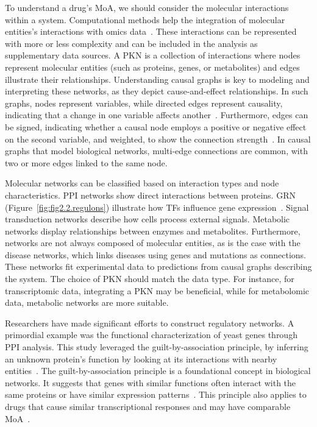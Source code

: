 To understand a drug's \gls{MoA}, we should consider the molecular interactions within a system.
Computational methods help the integration of molecular entities's interactions with omics data~\cite{RN38}.
These interactions can be represented with more or less complexity and can be included in the analysis as supplementary data sources. 
A \gls{PKN} is a collection of interactions where nodes represent molecular entities (such as proteins, genes, or metabolites) and edges illustrate their relationships. 
Understanding causal graphs is key to modeling and interpreting these networks, as they depict cause-and-effect relationships. 
In such graphs, nodes represent variables, while directed edges represent causality, indicating that a change in one variable affects another~\cite{RN37}. 
Furthermore, edges can be signed, indicating whether a causal node employs a positive or negative effect on the second variable, and weighted, to show the connection strength~\cite{RN37}. 
In causal graphs that model biological networks, multi-edge connections are common, with two or more edges linked to the same node. 

\gls{Molecular network}s can be classified based on interaction types and node characteristics. \gls{PPI} networks show direct interactions between proteins. 
\gls{GRN} (Figure~\ref{fig:fig2.2.regulons}) illustrate how \gls{TF}s influence gene expression~\cite{RN145}. 
Signal transduction networks describe how cells process external signals. Metabolic networks display relationships between enzymes and metabolites. 
Furthermore, networks are not always composed of molecular entities, as is the case with the disease networks, which links diseases using genes and mutations as connections. 
These networks fit experimental data to predictions from causal graphs describing the system. The choice of \gls{PKN} should match the data type. 
For instance, for transcriptomic data, integrating a \gls{PKN} may be beneficial, while for metabolomic data, metabolic networks are more suitable. 

Researchers have made significant efforts to construct regulatory networks. A primordial example was the functional characterization of yeast genes through \gls{PPI} analysis. This study leveraged the guilt-by-association principle, by inferring an unknown protein's function by looking at its interactions with nearby entities~\cite{RN37, RN103}. 
The guilt-by-association principle is a foundational concept in biological networks. It suggests that genes with similar functions often interact with the same proteins or have similar expression patterns~\cite{RN133}. 
This principle also applies to drugs that cause similar transcriptional responses and may have comparable \gls{MoA}~\cite{RN64}.

